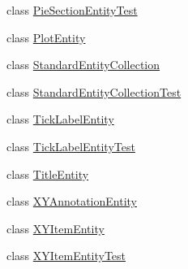 \begin{DoxyCompactItemize}
\item 
class \mbox{\hyperlink{classorg_1_1jfree_1_1chart_1_1entity_1_1_pie_section_entity_test}{Pie\+Section\+Entity\+Test}}
\item 
class \mbox{\hyperlink{classorg_1_1jfree_1_1chart_1_1entity_1_1_plot_entity}{Plot\+Entity}}
\item 
class \mbox{\hyperlink{classorg_1_1jfree_1_1chart_1_1entity_1_1_standard_entity_collection}{Standard\+Entity\+Collection}}
\item 
class \mbox{\hyperlink{classorg_1_1jfree_1_1chart_1_1entity_1_1_standard_entity_collection_test}{Standard\+Entity\+Collection\+Test}}
\item 
class \mbox{\hyperlink{classorg_1_1jfree_1_1chart_1_1entity_1_1_tick_label_entity}{Tick\+Label\+Entity}}
\item 
class \mbox{\hyperlink{classorg_1_1jfree_1_1chart_1_1entity_1_1_tick_label_entity_test}{Tick\+Label\+Entity\+Test}}
\item 
class \mbox{\hyperlink{classorg_1_1jfree_1_1chart_1_1entity_1_1_title_entity}{Title\+Entity}}
\item 
class \mbox{\hyperlink{classorg_1_1jfree_1_1chart_1_1entity_1_1_x_y_annotation_entity}{X\+Y\+Annotation\+Entity}}
\item 
class \mbox{\hyperlink{classorg_1_1jfree_1_1chart_1_1entity_1_1_x_y_item_entity}{X\+Y\+Item\+Entity}}
\item 
class \mbox{\hyperlink{classorg_1_1jfree_1_1chart_1_1entity_1_1_x_y_item_entity_test}{X\+Y\+Item\+Entity\+Test}}
\end{DoxyCompactItemize}
